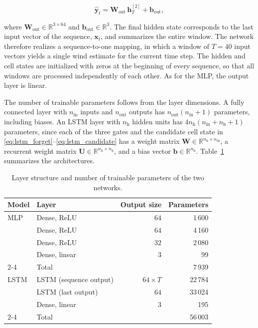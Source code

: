 \begin{equation}
	\hat{\bm{y}}_t = \bm{W}_\mathrm{out} \, \bm{h}^{[2]}_T + \bm{b}_\mathrm{out},
	\label{eq:lstm_output_layer}
\end{equation}

where $\bm{W}_\mathrm{out} \in \mathbb{R}^{3 \times 64}$ and $\bm{b}_\mathrm{out} \in \mathbb{R}^{3}$. The final hidden state corresponds to the last input vector of the sequence, $\bm{x}_t$, and summarizes the entire window. The network therefore realizes a sequence-to-one mapping, in which a window of $T = 40$ input vectors yields a single wind estimate for the current time step. The hidden and cell states are initialized with zeros at the beginning of every sequence, so that all windows are processed independently of each other. As for the MLP, the output layer is linear.

The number of trainable parameters follows from the layer dimensions. A fully connected layer with $n_\mathrm{in}$ inputs and $n_\mathrm{out}$ outputs has $n_\mathrm{out}(n_\mathrm{in} + 1)$ parameters, including biases. An LSTM layer with $n_\mathrm{h}$ hidden units has $4 n_\mathrm{h} (n_\mathrm{in} + n_\mathrm{h} + 1)$ parameters, since each of the three gates and the candidate cell state in \eqref{eq:lstm_forget}--\eqref{eq:lstm_candidate} has a weight matrix $\bm{W} \in \mathbb{R}^{n_\mathrm{h} \times n_\mathrm{in}}$, a recurrent weight matrix $\bm{U} \in \mathbb{R}^{n_\mathrm{h} \times n_\mathrm{h}}$, and a bias vector $\bm{b} \in \mathbb{R}^{n_\mathrm{h}}$. Table~\ref{tab:architectures} summarizes the architectures. 

\begin{table}[htb]
	\centering
	\caption{Layer structure and number of trainable parameters of the two networks.}
	\label{tab:architectures}
	\begin{tabular}{llrr}
		\toprule
		Model & Layer & Output size & Parameters \\
		\midrule
		MLP  & Dense, ReLU    & $64$          & 1\,600 \\
		& Dense, ReLU    & $64$          & 4\,160 \\
		& Dense, ReLU    & $32$          & 2\,080 \\
		& Dense, linear  & $3$           & 99 \\
		\cmidrule(l){2-4}
		& Total          &               & 7\,939 \\
		\midrule
		LSTM & LSTM (sequence output) & $64 \times T$ & 22\,784 \\
		& LSTM (last output)     & $64$          & 33\,024 \\
		& Dense, linear          & $3$           & 195 \\
		\cmidrule(l){2-4}
		& Total                  &               & 56\,003 \\
		\bottomrule
	\end{tabular}
\end{table}

